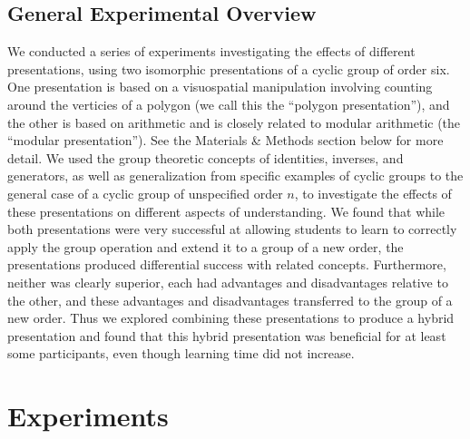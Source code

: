 \documentclass[man,10pt]{apa6}
\begin{document}
\subsection{General Experimental Overview}
We conducted a series of experiments investigating the effects of different presentations, using two isomorphic presentations of a cyclic group of order six. One presentation is based on a visuospatial manipulation involving counting around the verticies of a polygon (we call this the ``polygon presentation''), and the other is based on arithmetic and is closely related to modular arithmetic (the ``modular presentation''). See the Materials \& Methods section below for more detail. We used the group theoretic concepts of identities, inverses, and generators, as well as generalization from specific examples of cyclic groups to the general case of a cyclic group of unspecified order $n$, to investigate the effects of these presentations on different aspects of understanding. We found that while both presentations were very successful at allowing students to learn to correctly apply the group operation and extend it to a group of a new order, the presentations produced differential success with related concepts. Furthermore, neither was clearly superior, each had advantages and disadvantages relative to the other, and these advantages and disadvantages transferred to the group of a new order. Thus we explored combining these presentations to produce a hybrid presentation and found that this hybrid presentation was beneficial for at least some participants, even though learning time did not increase.
\section{Experiments}
\end{document}
